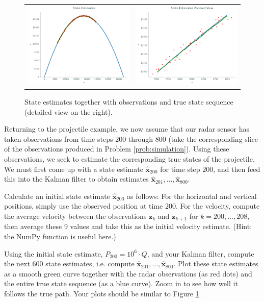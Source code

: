 \begin{figure}
    \centering
    \begin{tabular}{cc}
    \includegraphics[width=.45\textwidth]{figures/estimate_macro} &
    \includegraphics[width=.45\textwidth]{figures/estimate_micro}
    \end{tabular}
    \caption{State estimates together with observations and true state sequence (detailed view on the right).}
    \label{fig:estimates}
\end{figure}

Returning to the projectile example, we now assume that our radar sensor has taken observations from time steps $200$ through $800$ (take the corresponding slice of the
observations produced in Problem \ref{prob:simulation}).
Using these observations, we seek to estimate the corresponding true states of the projectile.
We must first come up with a state estimate $\widehat{\mathbf{x}}_{200}$ for time step $200$, and then feed this into the Kalman filter
to obtain estimates $\widehat{\mathbf{x}}_{201}, \ldots, \widehat{\mathbf{x}}_{800}$.
\begin{problem}
Calculate an initial state estimate $\widehat{\mathbf{x}}_{200}$ as follows:
For the horizontal and vertical positions, simply use the observed position at time $200$.
For the velocity, compute the average velocity between the observations $\mathbf{z}_k$ and $\mathbf{z}_{k+1}$ for
$k = 200,\ldots,208$, then average these 9 values and take this as the initial velocity estimate.
(Hint: the NumPy function  is useful here.)

Using the initial state estimate, $P_{200} = 10^{6} \cdot Q$, and your Kalman filter, compute the next $600$ state estimates,
i.e. compute $\widehat{\mathbf{x}}_{201}, \ldots, \widehat{\mathbf{x}}_{800}$.
Plot these state estimates as a smooth green curve together with the radar observations (as red dots) and the entire true state sequence (as a blue curve).
Zoom in to see how well it follows the true path. Your plots should be similar to Figure \ref{fig:estimates}.
\label{prob:state_estimate}
\end{problem}

